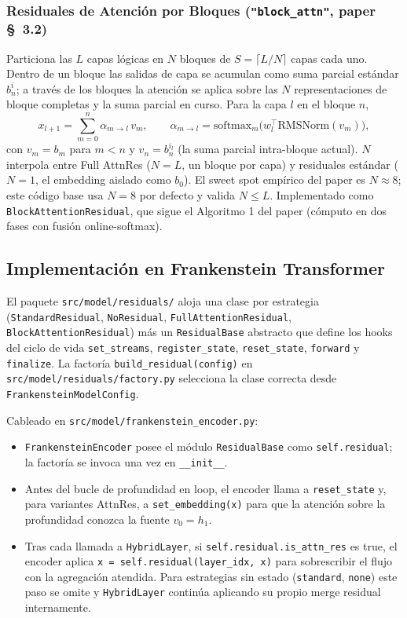 \subsubsection{Residuales de Atención por Bloques (\texttt{"block\_attn"}, paper \S~3.2)}

Particiona las $L$ capas lógicas en $N$ bloques de
$S = \lceil L / N \rceil$ capas cada uno. Dentro de un bloque las
salidas de capa se acumulan como suma parcial estándar $b_n^i$; a
través de los bloques la atención se aplica sobre las $N$
representaciones de bloque completas y la suma parcial en curso.
Para la capa $l$ en el bloque $n$,
\[
x_{l+1} = \sum_{m=0}^{n} \alpha_{m \to l} \, v_m, \qquad
\alpha_{m \to l} = \mathrm{softmax}_m\!\big(w_l^{\top} \mathrm{RMSNorm}(v_m)\big),
\]
con $v_m = b_m$ para $m < n$ y $v_n = b_n^{i_l}$ (la suma parcial
intra-bloque actual). $N$ interpola entre Full AttnRes ($N = L$, un
bloque por capa) y residuales estándar ($N = 1$, el embedding aislado
como $b_0$). El sweet spot empírico del paper es $N \approx 8$; este
código base usa $N = 8$ por defecto y valida $N \le L$. Implementado
como \texttt{BlockAttentionResidual}, que sigue el Algoritmo 1 del
paper (cómputo en dos fases con fusión online-softmax).

\subsection{Implementación en Frankenstein Transformer}

El paquete \texttt{src/model/residuals/} aloja una clase por estrategia
(\texttt{StandardResidual}, \texttt{NoResidual},
\texttt{FullAttentionResidual}, \texttt{BlockAttentionResidual}) más
un \texttt{ResidualBase} abstracto que define los hooks del ciclo de
vida \texttt{set\_streams}, \texttt{register\_state},
\texttt{reset\_state}, \texttt{forward} y \texttt{finalize}. La factoría
\texttt{build\_residual(config)} en \texttt{src/model/residuals/factory.py}
selecciona la clase correcta desde \texttt{FrankensteinModelConfig}.

Cableado en \texttt{src/model/frankenstein\_encoder.py}:
\begin{itemize}[leftmargin=*]
    \item \texttt{FrankensteinEncoder} posee el módulo
        \texttt{ResidualBase} como \texttt{self.residual}; la factoría
        se invoca una vez en \texttt{\_\_init\_\_}.
    \item Antes del bucle de profundidad en loop, el encoder llama a
        \texttt{reset\_state} y, para variantes AttnRes, a
        \texttt{set\_embedding(x)} para que la atención sobre la
        profundidad conozca la fuente $v_0 = h_1$.
    \item Tras cada llamada a \texttt{HybridLayer}, si
        \texttt{self.residual.is\_attn\_res} es true, el encoder aplica
        \texttt{x = self.residual(layer\_idx, x)} para sobrescribir el
        flujo con la agregación atendida. Para estrategias sin estado
        (\texttt{standard}, \texttt{none}) este paso se omite y
        \texttt{HybridLayer} continúa aplicando su propio merge
        residual internamente.
\end{itemize}

